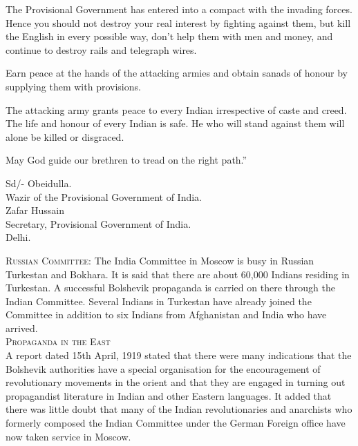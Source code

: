 The Provisional Government has entered into a compact with the invading forces. Hence you should not destroy your real interest by fighting against them, but kill the English in every possible way, don't help them with men and money, and continue to destroy rails and telegraph wires. 

Earn peace at the hands of the attacking armies and obtain sanads of honour by supplying them with provisions. 

The attacking army grants peace to every Indian irrespective of caste and creed. The life and honour of every Indian is safe. He who will stand against them will alone be killed or disgraced. 

May God guide our brethren to tread on the right path.” 

\begin{center}
Sd/- Obeidulla. \\
Wazir of the Provisional Government of India. \\

Zafar Hussain\\

Secretary, Provisional Government of India. \\

Delhi. \\
\end{center}

\textsc{Russian Committee:} The India Committee in Moscow is busy in Russian Turkestan and Bokhara. It is said that there are about 60,000 Indians residing in Turkestan. A successful Bolshevik propaganda is carried on there through the Indian Committee. Several Indians in Turkestan have already joined the Committee in addition to six Indians from Afghanistan and India who have arrived. \\

\textsc{Propaganda in the East}\\

A report dated 15th April, 1919 stated that there were many indications that the Bolshevik authorities have a special organisation for the encouragement of revolutionary movements in the orient and that they are engaged in turning out propagandist literature in Indian and other Eastern languages. It added that there was little doubt that many of the Indian revolutionaries and anarchists who formerly composed the 
Indian Committee under the German Foreign office have now taken service in Moscow. 

